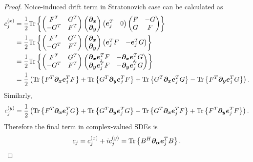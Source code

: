 \begin{proof}
Noice-induced drift term in Stratonovich case can be calculated as
\begin{equation*}
\begin{split}
	c_j^{(x)}
	& = \frac{1}{2} \mathrm{Tr} \left\{ 
		\begin{pmatrix}
			F^T & G^T \\ -G^T & F^T
		\end{pmatrix}
		\begin{pmatrix}
			\bm{\partial}_{\bm{x}} \\
			\bm{\partial}_{\bm{y}}
		\end{pmatrix}
		\begin{pmatrix}
			\bm{e}_j^T & 0
		\end{pmatrix}
		\begin{pmatrix}
			F & -G \\ G & F
		\end{pmatrix}
	 \right\} \\
	& = \frac{1}{2} \mathrm{Tr} \left\{ 
		\begin{pmatrix}
			F^T & G^T \\ -G^T & F^T
		\end{pmatrix}
		\begin{pmatrix}
			\bm{\partial}_{\bm{x}} \\
			\bm{\partial}_{\bm{y}}
		\end{pmatrix}
		\begin{pmatrix}
			\bm{e}_j^T F & - \bm{e}_j^T G
		\end{pmatrix}
	 \right\} \\
	& = \frac{1}{2} \mathrm{Tr} \left\{ 
		\begin{pmatrix}
			F^T & G^T \\ -G^T & F^T
		\end{pmatrix}
		\begin{pmatrix}
			\bm{\partial}_{\bm{x}} \bm{e}_j^T F & - \bm{\partial}_{\bm{x}} \bm{e}_j^T G \\
			\bm{\partial}_{\bm{y}} \bm{e}_j^T F & - \bm{\partial}_{\bm{y}} \bm{e}_j^T G
		\end{pmatrix}
	 \right\} \\
	& = \frac{1}{2} \left(
		\mathrm{Tr} \left\{  F^T \bm{\partial}_{\bm{x}} \bm{e}_j^T F  \right\}
		+ \mathrm{Tr} \left\{  G^T \bm{\partial}_{\bm{y}} \bm{e}_j^T F  \right\}
		+ \mathrm{Tr} \left\{  G^T \bm{\partial}_{\bm{x}} \bm{e}_j^T G  \right\}
		- \mathrm{Tr} \left\{  F^T \bm{\partial}_{\bm{y}} \bm{e}_j^T G  \right\}
	\right).
\end{split}
\end{equation*}
Similarly,
\[
	c_j^{(y)}
	= \frac{1}{2} \left(
		\mathrm{Tr} \left\{  F^T \bm{\partial}_{\bm{x}} \bm{e}_j^T G  \right\}
		+ \mathrm{Tr} \left\{  G^T \bm{\partial}_{\bm{y}} \bm{e}_j^T G  \right\}
		- \mathrm{Tr} \left\{  G^T \bm{\partial}_{\bm{x}} \bm{e}_j^T F  \right\}
		+ \mathrm{Tr} \left\{  F^T \bm{\partial}_{\bm{y}} \bm{e}_j^T F  \right\}
	\right).
\]
Therefore the final term in complex-valued SDEs is
\[
	c_j
	= c_j^{(x)} + i c_j^{(y)}
	= \mathrm{Tr} \left\{  B^H \bm{\partial}_{\bm{\alpha}} \bm{e}_j^T B  \right\}.
	\qedhere
\]
\end{proof}

